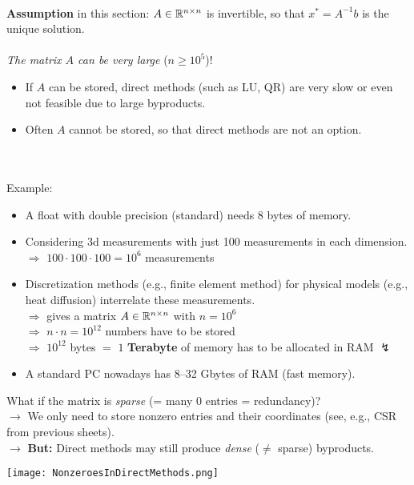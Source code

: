 \begin{frame}
~\\
\textbf{Assumption} in this section: $A \in {\mathbb{R}}^{n\times n}$ is invertible, so that $x^* = A^{-1}b$ is the unique solution.\\~\\
%
%
 \textit{The matrix $A$ can be very large} ($n \geq 10^5$)!\\
\begin{itemize}
	\item If $A$ can be stored, direct methods (such as LU, QR) are very slow or even not feasible due to large byproducts.
	\item Often $A$ cannot be stored, so that direct methods are not an option.
\end{itemize}
~\\~\\
Example:
\begin{itemize}
	\item A float with double precision (standard) needs 8 bytes of memory.\\\vspace{0.05cm}
	\item Considering 3d measurements with just 100 measurements in each dimension. \\
	$\Rightarrow$ $100 \cdot 100 \cdot 100 = 10^6$ measurements \\\vspace{0.05cm}
	\item Discretization methods (e.g., finite element method) for physical models (e.g., heat diffusion) interrelate these measurements. \\
	$\Rightarrow$ gives a matrix $A \in {\mathbb{R}}^{n\times n}$ with $n = 10^6$ \\	
	$\Rightarrow$ $n\cdot n = 10^{12}$ numbers have to be stored\\
	$\Rightarrow$ $10^{12}$ bytes $=$ $1$ \textbf{Terabyte} of memory has to be allocated in RAM {\bfseries\color{red}\LARGE $\lightning$}\\\vspace{0.05cm}
	\item A standard PC nowadays has 8--32 Gbytes of RAM (fast memory).
\end{itemize}
\end{frame}

\begin{frame}
	What if the matrix is \textit{sparse} (= many $0$ entries = redundancy)?\\
	$\rightarrow$ We only need to store nonzero entries and their coordinates (see, e.g., CSR from previous sheets).\\
	$\rightarrow$ \textbf{But:} Direct methods may still produce \textit{dense} ($\neq$ sparse) byproducts.\\
	\begin{center}
		{\color{black}
			
		}
		\texttt{[image: NonzeroesInDirectMethods.png]}
	\end{center} 
\end{frame}


